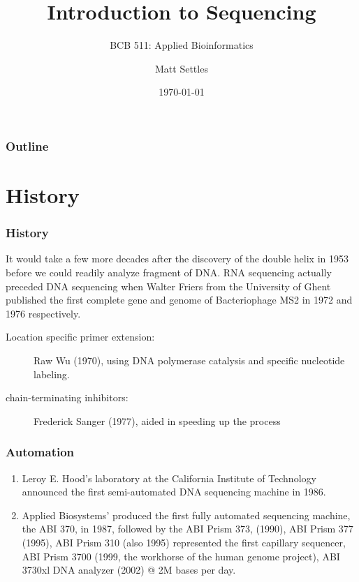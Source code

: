 \documentclass{beamer}
\title[Introduction to Sequencing]{Introduction to Sequencing}
\subtitle{BCB 511: Applied Bioinformatics\\}
\author[Matt Settles]{Matt Settles}
\institute{University of Idaho}
\date{\today}
\begin{document}
\begin{frame}[plain]
  \titlepage
\end{frame}


\begin{frame}[plain] 
  \frametitle{Outline}
  \tableofcontents
\end{frame}

\section{History}

\begin{frame}
  \frametitle{History}
It would take a few more decades after the discovery of the double helix in 1953 before we could readily analyze fragment of DNA. RNA sequencing actually preceded DNA sequencing when Walter Friers from the University of Ghent published the first complete gene and genome of Bacteriophage MS2 in 1972 and 1976 respectively.
  \begin{description}
  \item[Location specific primer extension:]	Raw Wu (1970), using DNA polymerase catalysis and specific nucleotide labeling.
  \item[chain-terminating inhibitors:] Frederick Sanger (1977), aided in speeding up the process
  \end{description}
\end{frame}

\begin{frame}
  \frametitle{Automation}
  \begin{enumerate}
  \item Leroy E. Hood's laboratory at the California Institute of Technology announced the first semi-automated DNA sequencing machine in 1986.
  \item Applied Biosystems' produced the first fully automated sequencing machine, the ABI 370, in 1987, followed by the ABI Prism 373, (1990), ABI Prism 377 (1995), ABI Prism 310 (also 1995) represented the first capillary sequencer, ABI Prism 3700  (1999, the workhorse of the human genome project), ABI 3730xl DNA analyzer (2002) @ 2M bases per day.
\end{enumerate}
\end{frame}
\end{document}
